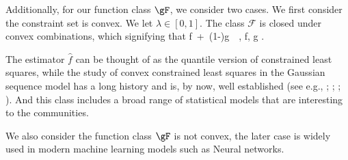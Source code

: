 \documentclass[twoside,11pt]{article}
\begin{document}
Additionally, for our function class $\gF$, we consider two cases.  We first consider the constraint set is convex.  
We let $\lambda \in [0,1]$. The class $\mathcal{F}$ is closed under convex combinations, which signifying that
\beq
\label{F_1}
\lambda f \,+\, (1-\lambda)g \,\in\, , \quad \forall f, g \in {}.
\beq

The estimator \(\hat{f}\) can be thought of as the quantile version of constrained least squares, while the study of convex constrained least squares in the Gaussian sequence model has a long history and is, by now, well established (see e.g., \cite{van1990estimating}; \cite{van1996weak}; \cite{hjort2011asymptotics}; \cite{chatterjee2015risk}). And this class includes a broad range of statistical models that are interesting to the communities. 

We also consider the function class $\gF$ is not convex, the later case is widely used in modern machine learning models such as Neural networks. 
\end{document}
